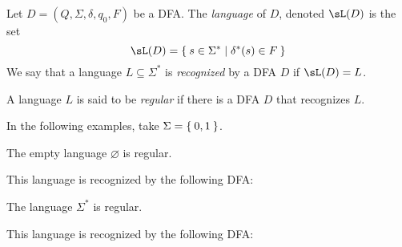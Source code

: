 \documentclass{zett}
\begin{document}
\begin{defn}
  Let $D = (Q, \Sigma, \delta, q_{0}, F)$ be a DFA.
  The \emph{language} of $D$, denoted $\sL(D)$ is the set
  $$
  \sL(D) = \Set{s \in \Sigma^{*} \mid \delta^{*}(s) \in F}
  $$
  We say that a language $L \subseteq \Sigma^{*}$ is \emph{recognized} by a DFA $D$ if $\sL(D) = L$.
\end{defn}

\begin{defn}
  A language $L$ is said to be \emph{regular} if there is a DFA $D$ that recognizes $L$.
\end{defn}

\begin{node}%
  In the following examples, take $\Sigma = \Set{0,1}$.
\end{node}

\begin{eg}
  The empty language $\varnothing$ is regular.
\end{eg}
\begin{node}
  This language is recognized by the following DFA:
  \begin{center}
  \end{center}
\end{node}

\begin{eg}
  The language $\Sigma^{*}$ is regular.
\end{eg}
\begin{node}
  This language is recognized by the following DFA:
  \begin{center}
  \end{center}
\end{node}
\end{document}
